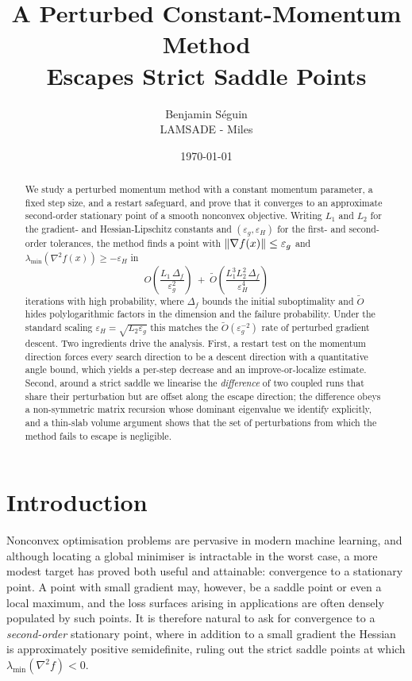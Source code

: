 \documentclass[11pt]{article}
\title{\bf A Perturbed Constant-Momentum Method\\
Escapes Strict Saddle Points}
\author{%
  Benjamin Séguin\\
  LAMSADE - Miles\\%
}
\date{\today}
\theoremstyle{plain}
\theoremstyle{definition}
\theoremstyle{remark}
\DeclarePairedDelimiter{\norm}{\lVert}{\rVert}
\newcommand{\lmin}{\lambda_{\min}}
\newcommand{\grad}{\nabla}
\newcommand{\Hess}{\nabla^2}
\newcommand{\eps}{\varepsilon}
\newcommand{\epsg}{\eps_{g}}
\newcommand{\epsH}{\eps_{H}}
\newcommand{\Otil}{\widetilde{O}}
\begin{document}
\maketitle

\begin{abstract}
We study a perturbed momentum method with a constant momentum parameter,
a fixed step size, and a restart safeguard, and prove that it converges
to an approximate second-order stationary point of a smooth nonconvex
objective. Writing
$L_{1}$ and $L_{2}$ for the gradient- and Hessian-Lipschitz constants
and $(\epsg,\epsH)$ for the first- and second-order tolerances, the
method finds a point with $\norm{\grad f(x)}\le\epsg$ and
$\lmin(\Hess f(x))\ge-\epsH$ in
\[
  O\!\left(\frac{L_{1}\,\Delta_{f}}{\epsg^{2}}\right)
  \;+\;
  \Otil\!\left(\frac{L_{1}^{3}L_{2}^{2}\,\Delta_{f}}{\epsH^{4}}\right)
\]
iterations with high probability, where $\Delta_{f}$ bounds the initial
suboptimality and $\Otil$ hides polylogarithmic factors in the
dimension and the failure probability. Under the standard scaling
$\epsH=\sqrt{L_{2}\epsg}$ this matches the $\Otil(\epsg^{-2})$ rate of
perturbed gradient descent. Two ingredients drive the analysis. First,
a restart test on the momentum direction forces every
search direction to be a descent direction with a quantitative angle
bound, which yields a per-step decrease and an improve-or-localize
estimate. Second, around a strict saddle we linearise the
\emph{difference} of two coupled runs that share their perturbation but
are offset along the escape direction; the difference obeys a
non-symmetric matrix recursion whose dominant eigenvalue we identify
explicitly, and a thin-slab volume argument shows that the set of
perturbations from which the method fails to escape is negligible.
\end{abstract}

\section{Introduction}
\label{sec:intro}

Nonconvex optimisation problems are pervasive in modern machine
learning, and although locating a global minimiser is intractable in
the worst case, a more modest target has proved both useful and
attainable: convergence to a stationary point. A point with small
gradient may, however, be a saddle point or even a local maximum, and
the loss surfaces arising in applications are often densely populated
by such points. It is therefore natural to ask for convergence to a
\emph{second-order} stationary point, where in addition to a small
gradient the Hessian is approximately positive semidefinite, ruling out
the strict saddle points at which $\lmin(\Hess f)<0$.
\end{document}
